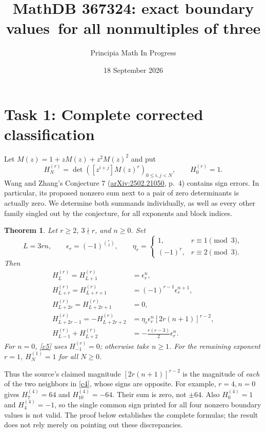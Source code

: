\documentclass[10pt]{article}
\title{MathDB 367324: exact boundary values\ for all nonmultiples of three}
\author{Principia Math In Progress}
\date{18 September 2026}
\newtheorem{theorem}{Theorem}
\begin{document}
\maketitle

\section*{Task 1: Complete corrected classification}
Let $M(z)=1+zM(z)+z^2M(z)^2$ and put
\[
 H_N^{(r)}=\det([z^{i+j}]M(z)^r)_{0\le i,j<N},\qquad H_0^{(r)}=1.
\]
Wang and Zhang's Conjecture 7
(\href{https://arxiv.org/abs/2502.21050}{arXiv:2502.21050}, p.~4)
contains sign errors. In particular, its proposed nonzero sum next
to a pair of zero determinants is actually zero. We determine both
summands individually, as well as every other family singled out
by the conjecture, for all exponents and block indices.

\begin{theorem}\label{classification}
Let $r\ge2$, $3\nmid r$, and $n\ge0$. Set
\[
 L=3rn,\qquad \epsilon_r=(-1)^{\binom r2},\qquad
 \eta_r=\begin{cases}1,&r\equiv1\pmod3,\\(-1)^r,&r\equiv2\pmod3.\end{cases}
\]
Then
\begin{align}
 H_L^{(r)}=H_{L+1}^{(r)}&=\epsilon_r^n,\label{c1}\\
 H_{L+r}^{(r)}=H_{L+r+1}^{(r)}&=(-1)^{r-1}\epsilon_r^{n+1},\label{c2}\\
 H_{L+2r}^{(r)}=H_{L+2r+1}^{(r)}&=0,\label{c3}\\
 H_{L+2r-1}^{(r)}=-H_{L+2r+2}^{(r)}
 &=\eta_r\epsilon_r^n[2r(n+1)]^{r-2},\label{c4}\\
 H_{L-1}^{(r)}+H_{L+2}^{(r)}&=-\frac{r(r-3)}2\epsilon_r^n.\label{c5}
\end{align}
For $n=0$, \eqref{c5} uses $H_{-1}^{(r)}=0$; otherwise take $n\ge1$.
For the remaining exponent $r=1$, $H_N^{(1)}=1$ for all $N\ge0$.
\end{theorem}
Thus the source's claimed magnitude $[2r(n+1)]^{r-2}$ is the
magnitude of \emph{each} of the two neighbors in \eqref{c4}, whose
signs are opposite. For example, $r=4,n=0$ gives $H_7^{(4)}=64$
and $H_{10}^{(4)}=-64$. Their sum is zero, not $\pm64$.
Also $H_0^{(4)}=1$ and $H_4^{(4)}=-1$, so the single common sign
printed for all four nonzero boundary values is not valid.
The proof below establishes the complete formulas; the result does
not rely merely on pointing out these discrepancies.
\end{document}

